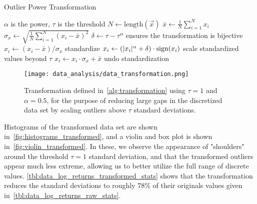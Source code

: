 \begin{algorithm}
\caption{Outlier Power Transformation}
\begin{algorithmic}[1]
            \Comment $\alpha$ is the power, $\tau$ is the threshold
        \State $N \gets \text{length}(\vec{x})$
        \State $\bar{x} \gets \frac{1}{N} \sum_{i=1}^{N} x_i$
        \State $\sigma_{x} \gets \sqrt{\frac{1}{N} \sum_{i=1}^{N} (x_i - \bar{x})^2}$
        \State $\delta \gets \tau - \tau^\alpha$
            \Comment ensures the transformation is bijective
            \State $x_i \gets (x_i - \bar{x}) / \sigma_x$
                \Comment standardize
                \State $x_i \gets (\lvert x_i\rvert^\alpha + \delta) \cdot \text{sign}(x_i)$
                    \Comment scale standardized values beyond $\tau$
            \EndIf
            \State $x_i \gets x_i \cdot \sigma_x + \bar{x}$
                \Comment undo standardization
        \EndFor
    \EndProcedure
\end{algorithmic}
\label{alg:transformation}
\end{algorithm}

\begin{figure}[!htb]
    \begin{center}
        \texttt{[image: data\_analysis/data\_transformation.png]}
    \end{center}
    \caption{Transformation defined in~\cref{alg:transformation} using \( \tau = 1 \) and \( \alpha = 0.5 \), for the purpose of reducing large gaps in the discretized data set by scaling outliers above \( \tau \) standard deviations.}
    \label{fig:data_transformation}
\end{figure}

Histograms of the transformed data set are shown in~\cref{fig:histograms_transformed}, and a violin and box plot is shown in~\cref{fig:violin_transformed}.
In these, we observe the appearance of "shoulders" around the threshold \( \tau = 1 \) standard deviation, and that the transformed outliers appear much less extreme, allowing us to better utilize the full range of discrete values.
\cref{tbl:data_log_returns_transformed_stats} shows that the transformation reduces the standard deviations to roughly \( 78\% \) of their originals values given in~\cref{tbl:data_log_returns_raw_stats}.

